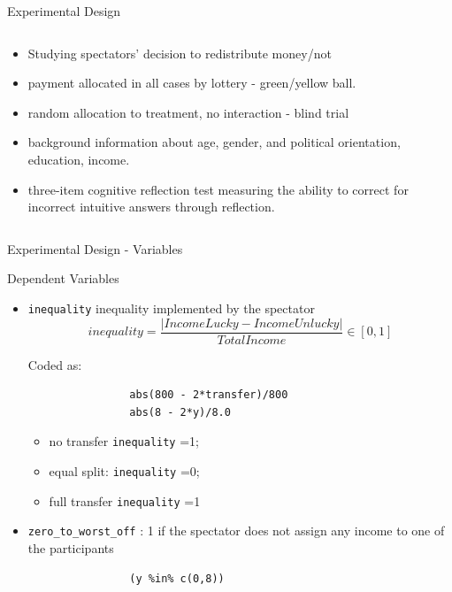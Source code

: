 \documentclass{beamer}
\begin{document}
\begin{frame}{Experimental Design}
\begin{block}
\begin{columns}[T]
		\begin{column}{0.75\linewidth}
		\begin{itemize}
	\item Studying spectators' decision to redistribute money/not
	\item payment allocated in all cases by lottery -  green/yellow ball.
	\item random allocation to treatment, no interaction - blind trial
	\item background information about age, gender, and political orientation, education, income.
	\item three-item cognitive reflection test measuring the ability to correct for incorrect
	intuitive answers through reflection.
\end{itemize}
		\end{column}
		\end{columns}
		
	\end{block}
\end{frame}

\begin{frame}[fragile]{Experimental Design - Variables}

	\begin{block}{Dependent Variables}\small
		\begin{itemize}
			\item \texttt{inequality} inequality implemented by the spectator
			\[ inequality = \frac{|Income Lucky - Income Unlucky|}{Total Income} \in [0,1]\]

			Coded as:
			\begin{lstlisting}
				abs(800 - 2*transfer)/800
				abs(8 - 2*y)/8.0
			\end{lstlisting}

			\begin{itemize}
			\item no transfer \texttt{inequality} =1;
			\item equal split: \texttt{inequality} =0; \item full transfer \texttt{inequality} =1
			\end{itemize}			\item \texttt{zero\_to\_worst\_off} : 1 if the spectator does not assign any income to one of the participants

			\begin{lstlisting}
				(y %in% c(0,8))
			\end{lstlisting}
		\end{itemize}
	\end{block}


\end{frame}
\end{document}

